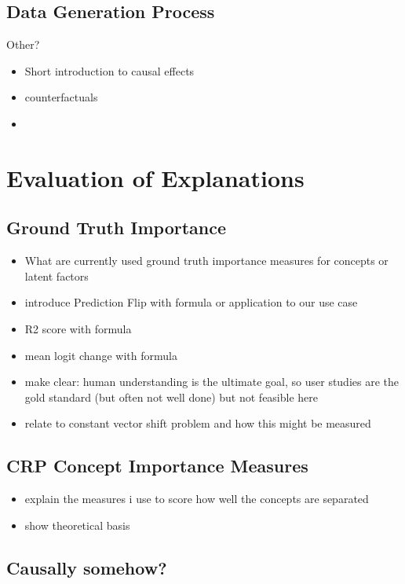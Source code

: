 \subsection{Data Generation Process}

Other?

\begin{itemize}
    \item Short introduction to causal effects    \item counterfactuals
    \item
\end{itemize}


\section{Evaluation of Explanations}
\subsection{Ground Truth Importance}
\begin{itemize}
    \item What are currently used ground truth importance measures for concepts or latent factors
    \item introduce Prediction Flip with formula or application to our use case
    \item R2 score with formula \cite{Sixt2020}
    \item mean logit change with formula
    \item make clear: human understanding is the ultimate goal, so user studies are the gold standard (but often not well done) but not feasible here
    \item relate to constant vector shift problem and how this might be measured
\end{itemize}
\subsection{CRP Concept Importance Measures}
\begin{itemize}
    \item explain the measures i use to score how well the concepts are separated
    \item show theoretical basis
\end{itemize}
\subsection{Causally somehow? }